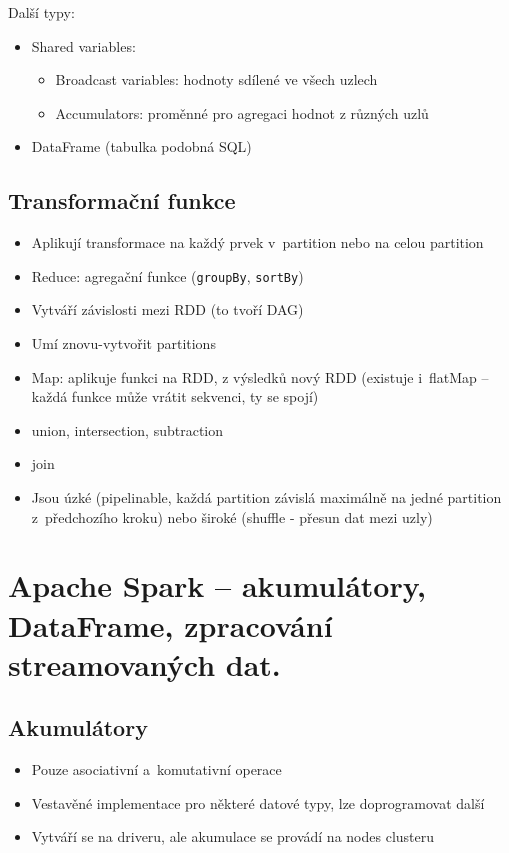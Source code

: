 Další typy:
\begin{itemize}
    \item Shared variables:
    \begin{itemize}
        \item Broadcast variables: hodnoty sdílené ve všech uzlech
        \item Accumulators: proměnné pro agregaci hodnot z různých uzlů
    \end{itemize}
    \item DataFrame (tabulka podobná SQL)
\end{itemize}

\subsection{Transformační funkce}
\begin{itemize}
    \item Aplikují transformace na každý prvek v~partition nebo na celou partition
    \item Reduce: agregační funkce (\texttt{groupBy}, \texttt{sortBy})
    \item Vytváří závislosti mezi RDD (to tvoří DAG)
    \item Umí znovu-vytvořit partitions
    \item Map: aplikuje funkci na RDD, z výsledků nový RDD (existuje i~flatMap -- každá funkce může vrátit sekvenci, ty se spojí)
    \item union, intersection, subtraction
    \item join
    \item Jsou úzké (pipelinable, každá partition závislá maximálně na jedné partition z~předchozího kroku) nebo široké (shuffle - přesun dat mezi uzly)
\end{itemize}

\section{Apache Spark – akumulátory, DataFrame, zpracování streamovaných dat.}
\subsection{Akumulátory}
\begin{itemize}
    \item Pouze asociativní a~komutativní operace
    \item Vestavěné implementace pro některé datové typy, lze doprogramovat další
    \item Vytváří se na driveru, ale akumulace se provádí na nodes clusteru
\end{itemize}
